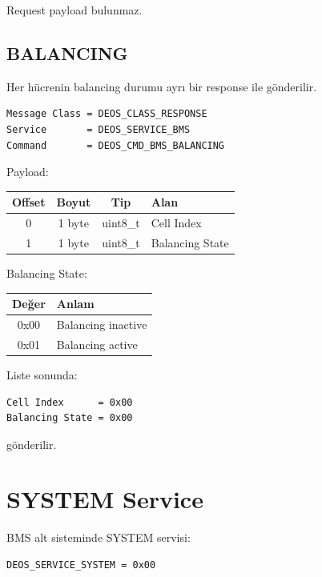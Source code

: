 \documentclass[a4paper,10pt]{article}
\begin{document}
Request payload bulunmaz.

\subsection{BALANCING}

Her hücrenin balancing durumu ayrı bir response ile gönderilir.

\begin{lstlisting}
Message Class = DEOS_CLASS_RESPONSE
Service       = DEOS_SERVICE_BMS
Command       = DEOS_CMD_BMS_BALANCING
\end{lstlisting}

Payload:

\begin{center}
\begin{tabular}{c c c l}
\toprule
\textbf{Offset} &
\textbf{Boyut} &
\textbf{Tip} &
\textbf{Alan} \\
\midrule

0 & 1 byte & uint8\_t & Cell Index \\
1 & 1 byte & uint8\_t & Balancing State \\

\bottomrule
\end{tabular}
\end{center}

Balancing State:

\begin{center}
\begin{tabular}{c l}
\toprule
\textbf{Değer} & \textbf{Anlam} \\
\midrule
0x00 & Balancing inactive \\
0x01 & Balancing active \\
\bottomrule
\end{tabular}
\end{center}

Liste sonunda:

\begin{lstlisting}
Cell Index      = 0x00
Balancing State = 0x00
\end{lstlisting}

gönderilir.

\section{SYSTEM Service}

BMS alt sisteminde SYSTEM servisi:

\begin{lstlisting}
DEOS_SERVICE_SYSTEM = 0x00
\end{lstlisting}
\end{document}
